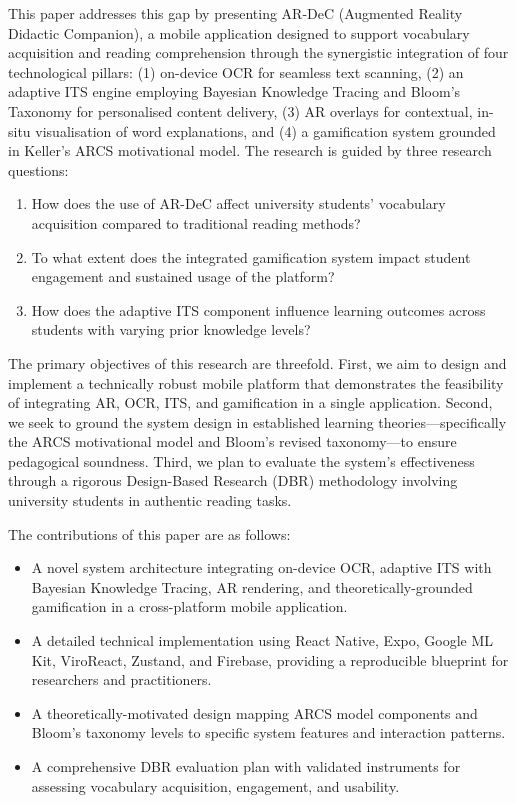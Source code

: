 This paper addresses this gap by presenting AR-DeC (Augmented Reality Didactic Companion), a mobile application designed to support vocabulary acquisition and reading comprehension through the synergistic integration of four technological pillars: (1) on-device OCR for seamless text scanning, (2) an adaptive ITS engine employing Bayesian Knowledge Tracing and Bloom's Taxonomy for personalised content delivery, (3) AR overlays for contextual, in-situ visualisation of word explanations, and (4) a gamification system grounded in Keller's ARCS motivational model. The research is guided by three research questions:

\begin{enumerate}[label=\textbf{RQ\arabic*:}]
    \item How does the use of AR-DeC affect university students' vocabulary acquisition compared to traditional reading methods?
    \item To what extent does the integrated gamification system impact student engagement and sustained usage of the platform?
    \item How does the adaptive ITS component influence learning outcomes across students with varying prior knowledge levels?
\end{enumerate}

The primary objectives of this research are threefold. First, we aim to design and implement a technically robust mobile platform that demonstrates the feasibility of integrating AR, OCR, ITS, and gamification in a single application. Second, we seek to ground the system design in established learning theories---specifically the ARCS motivational model and Bloom's revised taxonomy---to ensure pedagogical soundness. Third, we plan to evaluate the system's effectiveness through a rigorous Design-Based Research (DBR) methodology involving university students in authentic reading tasks.

The contributions of this paper are as follows:
\begin{itemize}
    \item A novel system architecture integrating on-device OCR, adaptive ITS with Bayesian Knowledge Tracing, AR rendering, and theoretically-grounded gamification in a cross-platform mobile application.
    \item A detailed technical implementation using React Native, Expo, Google ML Kit, ViroReact, Zustand, and Firebase, providing a reproducible blueprint for researchers and practitioners.
    \item A theoretically-motivated design mapping ARCS model components and Bloom's taxonomy levels to specific system features and interaction patterns.
    \item A comprehensive DBR evaluation plan with validated instruments for assessing vocabulary acquisition, engagement, and usability.
\end{itemize}

